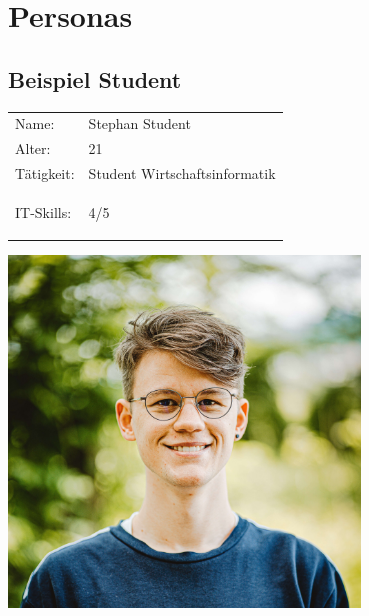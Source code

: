 \section{Personas}\label{sec:persona}


\subsection{Beispiel Student}

\begin{minipage}[t]{0.5\textwidth}
	\vspace{-4cm}
	\renewcommand{\arraystretch}{1.5}
	\begin{tabular}{l l}
		Name: & Stephan Student \\
		Alter: & 21 \\
		Tätigkeit: & Student Wirtschaftsinformatik \\
		IT-Skills: & 4/5 \hspace{-1cm} \begin{barchart}{5.0}
			\baritemNL{}{4}
		\end{barchart} \\
	\end{tabular}
\end{minipage}
\hfill
\begin{minipage}[t]{0.4\textwidth}
	\flushright
	\includegraphics[width=0.70\textwidth]{img/carlos-lindner-ZVo7vtXilCs-unsplash.jpg}
\end{minipage}

